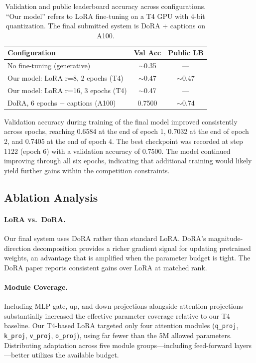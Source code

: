 \documentclass[11pt]{article}
\begin{document}
\begin{table}[h]
\centering
\begin{tabular}{lcc}
\toprule
\textbf{Configuration} & \textbf{Val Acc} & \textbf{Public LB} \\
\midrule
No fine-tuning (generative) & $\sim$0.35 & --- \\
Our model: LoRA r=8, 2 epochs (T4) & $\sim$0.47 & $\sim$0.47 \\
Our model: LoRA r=16, 3 epochs (T4) & $\sim$0.47 & --- \\
DoRA, 6 epochs + captions (A100) & 0.7500 & $\sim$0.74 \\
\bottomrule
\end{tabular}
\caption{Validation and public leaderboard accuracy across configurations. ``Our model'' refers to LoRA fine-tuning on a T4 GPU with 4-bit quantization. The final submitted system is DoRA + captions on A100.}
\label{tab:results}
\end{table}

Validation accuracy during training of the final model improved consistently across epochs, reaching 0.6584 at the end of epoch 1, 0.7032 at the end of epoch 2, and 0.7405 at the end of epoch 4. The best checkpoint was recorded at step 1122 (epoch 6) with a validation accuracy of 0.7500. The model continued improving through all six epochs, indicating that additional training would likely yield further gains within the competition constraints.

\subsection{Ablation Analysis}

\paragraph{LoRA vs.\ DoRA.}
Our final system uses DoRA rather than standard LoRA. DoRA's magnitude-direction decomposition provides a richer gradient signal for updating pretrained weights, an advantage that is amplified when the parameter budget is tight. The DoRA paper \cite{liu2024dora} reports consistent gains over LoRA at matched rank.

\paragraph{Module Coverage.}
Including MLP gate, up, and down projections alongside attention projections substantially increased the effective parameter coverage relative to our T4 baseline. Our T4-based LoRA targeted only four attention modules (\texttt{q\_proj}, \texttt{k\_proj}, \texttt{v\_proj}, \texttt{o\_proj}), using far fewer than the 5M allowed parameters. Distributing adaptation across five module groups---including feed-forward layers---better utilizes the available budget.
\end{document}
